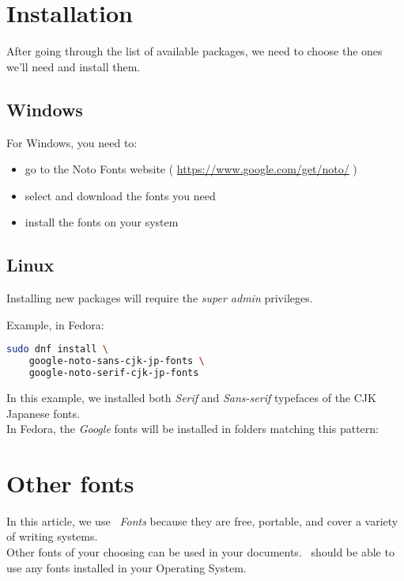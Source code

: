 \newpage

\section*{Installation}

After going through the list of available packages, we need to choose the ones we'll need and install them. 

\subsection*{Windows}

For Windows, you need to:
\begin{itemize}
	\item go to the Noto Fonts website ( \url{https://www.google.com/get/noto/} )
	\item select and download the fonts you need
	\item install the fonts on your system
\end{itemize}


\subsection*{Linux}

Installing new packages will require the \emph{super admin} privileges. \

Example, in Fedora:
\begin{lstlisting}[language=sh]
sudo dnf install \
	google-noto-sans-cjk-jp-fonts \
	google-noto-serif-cjk-jp-fonts
\end{lstlisting}

In this example, we installed both \emph{Serif} and \emph{Sans-serif} typefaces of the CJK Japanese fonts. \\


In Fedora, the \emph{Google \Noto} fonts will be installed in folders matching this pattern:

\bigskip

\section*{Other fonts}

In this article, we use \emph{\Noto\ Fonts} because they are free, portable, and cover a variety of writing systems. \\

Other fonts of your choosing can be used in your documents. \XeTeX\ should be able to use any fonts installed in your Operating System. \\
